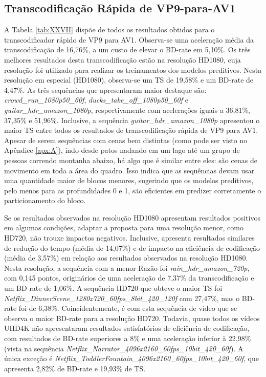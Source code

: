 \subsection{Transcodificação Rápida de VP9-para-AV1}
\label{cap:7.5.1}

A Tabela \ref{tab:XXVII} dispõe de todos os resultados obtidos para o transcodificador rápido de VP9 para AV1. Observa-se uma aceleração média da transcodificação de 16,76\%, a um custo de elevar o BD-rate em 5,10\%. Os três melhores resultados desta transcodificação estão na resolução HD1080, cuja resolução foi utilizado para realizar os treinamentos dos modelos preditivos. Nesta resolução em especial (HD1080), observa-se um TS de 19,58\% e um BD-rate de 4,47\%. As três sequências que apresentaram maior destaque são: \textit{crowd\_run\_1080p50\_60f}, \textit{ducks\_take\_off\_1080p50\_60f} e \textit{guitar\_hdr\_amazon\_1080p}, respectivamente com acelerações iguais a 36,81\%, 37,35\% e 51,96\%. Inclusive, a sequência \textit{guitar\_hdr\_amazon\_1080p} apresentou o maior TS entre todos os resultados de transcodificação rápida de VP9 para AV1. Apesar de serem sequências com cenas bem distintas (como pode ser visto no Apêndice \ref{apx:A}), indo desde patos nadando em um lago até um grupo de pessoas correndo montanha abaixo, há algo que é similar entre eles: são cenas de movimento em toda a área do quadro. Isso indica que as sequências devam usar uma quantidade maior de blocos menores, sugerindo que os modelos preditivos, pelo menos para as profundidades 0 e 1, são eficientes em predizer corretamente o particionamento do bloco.



Se os resultados observados na resolução HD1080 apresentam resultados positivos em algumas condições, adaptar a proposta para uma resolução menor, como HD720, não trouxe impactos negativos. Inclusive, apresenta resultados similares de redução do tempo (média de 14,07\%) e de impacto na eficiência de codificação (média de 3,57\%) em relação aos resultados observados na resolução HD1080. Nesta resolução, a sequência com a menor Razão foi \textit{rain\_hdr\_amazon\_720p}, com 0,145 pontos, originários de uma aceleração de 7,37\% da transcodificação e um BD-rate de 1,06\%. A sequência HD720 que obteve o maior TS foi \textit{Netflix\_DinnerScene\_1280x720\_60fps\_8bit\_420\_120f} com 27,47\%, mas o BD-rate foi de 6,38\%. Coincidentemente, é com esta sequência de vídeo que se observa o maior BD-rate para a resolução HD720. Todavia, quase todos os vídeos UHD4K não apresentaram resultados satisfatórios de eficiência de codificação, com resultados de BD-rate superiores a 8\% e uma aceleração inferior à 22,98\% (vista na sequência \textit{Netflix\_Narrator\_4096x2160\_60fps\_10bit\_420\_60f}). A única exceção é \textit{Netflix\_ToddlerFountain\_4096x2160\_60fps\_10bit\_420\_60f}, que apresenta 2,82\% de BD-rate e 19,93\% de TS. 


